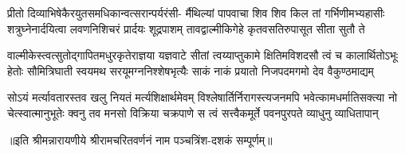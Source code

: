 \fourlineindentedshloka
{प्रीतो दिव्याभिषेकैरयुतसमधिकान्वत्सरान्पर्यरंसी-}
{र्मैथिल्यां पापवाचा शिव शिव किल तां गर्भिणीमभ्यहासीः}
{शत्रुघ्नेनार्दयित्वा लवणनिशिचरं प्रार्दयः शूद्रपाशम्}
{तावद्वाल्मीकिगेहे कृतवसतिरुपासूत सीता सुतौ ते} %

\fourlineindentedshloka
{वाल्मीकेस्त्वत्सुतोद्गापितमधुरकृतेराज्ञया यज्ञवाटे}
{सीतां त्वय्याप्तुकामे क्षितिमविशदसौ त्वं च कालार्थितोऽभूः}
{हेतोः सौमित्रिघाती स्वयमथ सरयूमग्ननिश्शेषभृत्यैः}
{साकं नाकं प्रयातो निजपदमगमो देव वैकुण्ठमाद्यम्} %

\fourlineindentedshloka
{सोऽयं मर्त्यावतारस्तव खलु नियतं मर्त्यशिक्षार्थमेवम्}
{विश्लेषार्तिर्निरागस्त्यजनमपि भवेत्कामधर्मातिसक्त्या}
{नो चेत्स्वात्मानुभूतेः क्वनु तव मनसो विक्रिया चक्रपाणे}
{स त्वं सत्त्वैकमूर्ते पवनपुरपते व्याधुनु व्याधितापान्} %

॥इति श्रीमन्नारायणीये श्रीरामचरितवर्णनं नाम पञ्चत्रिंश-दशकं सम्पूर्णम्॥

\closesection